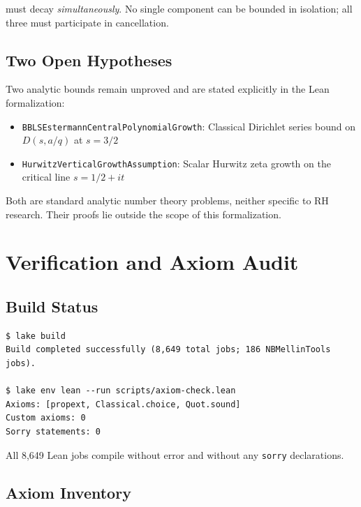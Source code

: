 \documentclass[11pt,a4paper]{article}
\theoremstyle{plain}
\theoremstyle{definition}
\theoremstyle{remark}
\begin{document}
must decay \emph{simultaneously}. No single component can be bounded in isolation; all three must participate in cancellation.

\subsection{Two Open Hypotheses}

Two analytic bounds remain unproved and are stated explicitly in the Lean formalization:

\begin{itemize}[leftmargin=2em]
  \item \texttt{BBLSEstermannCentralPolynomialGrowth}: Classical Dirichlet series bound on $D(s, a/q)$ at $s = 3/2$
  \item \texttt{HurwitzVerticalGrowthAssumption}: Scalar Hurwitz zeta growth on the critical line $s = 1/2 + it$
\end{itemize}

Both are standard analytic number theory problems, neither specific to RH research. Their proofs lie outside the scope of this formalization.

\section{Verification and Axiom Audit}
\label{sec:verification}

\subsection{Build Status}

\begin{verbatim}
$ lake build
Build completed successfully (8,649 total jobs; 186 NBMellinTools jobs).

$ lake env lean --run scripts/axiom-check.lean
Axioms: [propext, Classical.choice, Quot.sound]
Custom axioms: 0
Sorry statements: 0
\end{verbatim}

All 8,649 Lean jobs compile without error and without any \texttt{sorry} declarations.

\subsection{Axiom Inventory}
\end{document}
